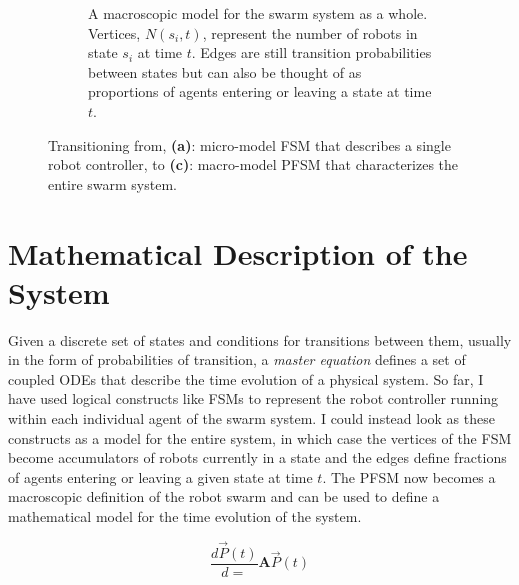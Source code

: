 \documentclass[defaultstyle,12pt]{thesis}
\newcommand{\D}[2]{\frac{d#1}{d#2}}
\begin{document}
\begin{figure}[!tb]
\begin{subfigure}[t]{.4\textwidth}
	\caption{A macroscopic model for the swarm system as a whole. Vertices, $N(s_i, t)$, represent the number of robots in state $s_i$ at time $t$. Edges are still transition probabilities between states but can also be thought of as proportions of agents entering or leaving a state at time $t$.}\label{fig:pfsmmacro}
	\end{subfigure}
\caption{Transitioning from, \textbf{(a)}: micro-model FSM that describes a single robot controller, to \textbf{(c)}: macro-model PFSM that characterizes the entire swarm system.}\label{fig:allfsm}
\end{figure}

\section{Mathematical Description of the System}
Given a discrete set of states and conditions for transitions between them, usually in the form of probabilities of transition, a \emph{master equation} defines a set of coupled ODEs that describe the time evolution of a physical system. So far, I have used logical constructs like FSMs to represent the robot controller running within each individual agent of the swarm system. I could instead look as these constructs as a model for the entire system, in which case the vertices of the FSM become accumulators of robots currently in a state and the edges define fractions of agents entering or leaving a given state at time $t$. The PFSM now becomes a macroscopic definition of the robot swarm and can be used to define a mathematical model for the time evolution of the system.

\begin{equation}
\D{\vec{P}(t)} = \mathbf{A}\vec{P}(t)\label{eq:firstmaster}
\end{equation}
\end{document}
